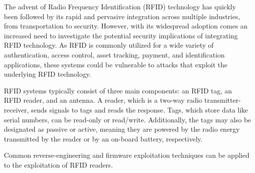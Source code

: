 
The advent of Radio Frequency Identification (RFID) technology has quickly been followed by its rapid and pervasive integration across multiple industries, from transportation to security. However, with its widespread adoption comes an increased need to investigate the potential security implications of integrating RFID technology. As RFID is commonly utilized for a wide variety of authentication, access control, asset tracking, payment, and identification applications, these systems could be vulnerable to attacks that exploit the underlying RFID technology. 

RFID systems typically consist of three main components: an RFID tag, an RFID reader, and an antenna. A reader, which is a two-way radio transmitter-receiver, sends signals to tags and reads the response. Tags, which store data like serial numbers, can be read-only or read/write. Additionally, the tags may also be designated as passive or active, meaning they are powered by the radio energy transmitted by the reader or by an on-board battery, respectively.

Common reverse-engineering and firmware exploitation techniques can be applied to the exploitation of RFID readers. 